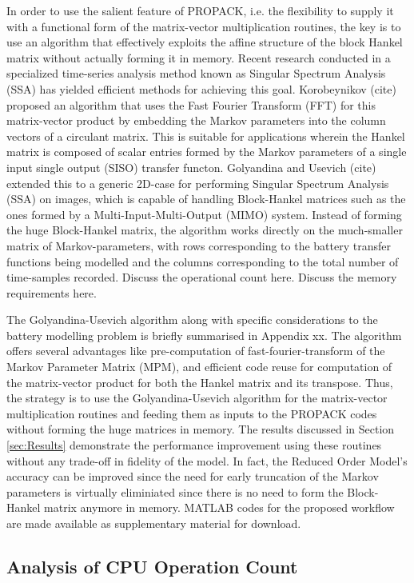 In order to use the salient feature of PROPACK, i.e. the flexibility
to supply it with a functional form of the matrix-vector multiplication
routines, the key is to use an algorithm that effectively exploits
the affine structure of the block Hankel matrix without actually forming
it in memory. Recent research conducted in a specialized time-series
analysis method known as Singular Spectrum Analysis (SSA) has yielded
efficient methods for achieving this goal. Korobeynikov (cite) proposed
an algorithm that uses the Fast Fourier Transform (FFT) for this matrix-vector
product by embedding the Markov parameters into the column vectors
of a circulant matrix. This is suitable for applications wherein the
Hankel matrix is composed of scalar entries formed by the Markov parameters
of a single input single output (SISO) transfer functon. Golyandina
and Usevich (cite) extended this to a generic 2D-case for performing
Singular Spectrum Analysis (SSA) on images, which is capable of handling
Block-Hankel matrices such as the ones formed by a Multi-Input-Multi-Output
(MIMO) system. Instead of forming the huge Block-Hankel matrix, the
algorithm works directly on the much-smaller matrix of Markov-parameters,
with rows corresponding to the battery transfer functions being modelled
and the columns corresponding to the total number of time-samples
recorded. Discuss the operational count here. Discuss the memory requirements
here.

The Golyandina-Usevich algorithm along with specific considerations
to the battery modelling problem is briefly summarised in Appendix
xx. The algorithm offers several advantages like pre-computation of
fast-fourier-transform of the Markov Parameter Matrix (MPM), and efficient
code reuse for computation of the matrix-vector product for both the
Hankel matrix and its transpose. Thus, the strategy is to use the
Golyandina-Usevich algorithm for the matrix-vector multiplication
routines and feeding them as inputs to the PROPACK codes without forming
the huge matrices in memory. The results discussed in Section \ref{sec:Results}
demonstrate the performance improvement using these routines without
any trade-off in fidelity of the model. In fact, the Reduced Order
Model's accuracy can be improved since the need for early truncation
of the Markov parameters is virtually eliminiated since there is no
need to form the Block-Hankel matrix anymore in memory. MATLAB codes
for the proposed workflow are made available as supplementary material
for download.

\subsection{Analysis of CPU Operation Count}

